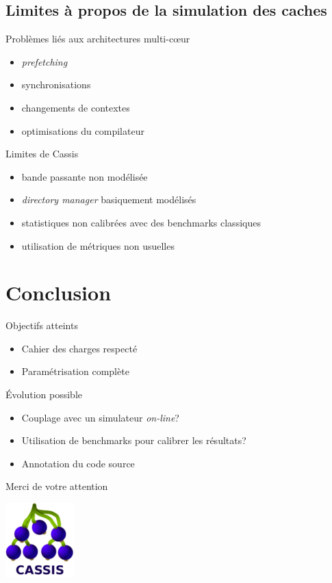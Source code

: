 \subsection{Limites \`a  propos de la simulation des caches}
\begin{frame}
  \begin{block}{Probl\`emes li\'es aux architectures multi-c{\oe}ur}
    \begin{itemize}
      \item \emph{prefetching}
      \item synchronisations
      \item changements de contextes 
      \item optimisations du compilateur
    \end{itemize}
  \end{block}
  \begin{block}{Limites de Cassis}
    \begin{itemize}
      \item bande passante non mod\'elis\'ee
      \item \emph{directory manager} basiquement mod\'elis\'es
      \item statistiques non calibr\'ees avec des benchmarks classiques
      \item utilisation de m\'etriques non usuelles
    \end{itemize}
  \end{block}
\end{frame}


\section*{Conclusion}
\begin{frame}
  \begin{block}{Objectifs atteints}
    \begin{itemize}
      \item Cahier des charges respect\'e
      \item Param\'etrisation compl\`ete
    \end{itemize}
  \end{block}

  \begin{block}{\'Evolution possible}
    \begin{itemize}
      \item Couplage avec un simulateur \emph{on-line}?
      \item Utilisation de benchmarks pour calibrer les r\'esultats?
      \item Annotation du code source
    \end{itemize}
  \end{block}
\end{frame}

\begin{frame}
\begin{center}
  Merci de votre attention
  \begin{center}
  \includegraphics[scale=.5]{images/cassis.png}
  \end{center}
\end{center}
\end{frame}
